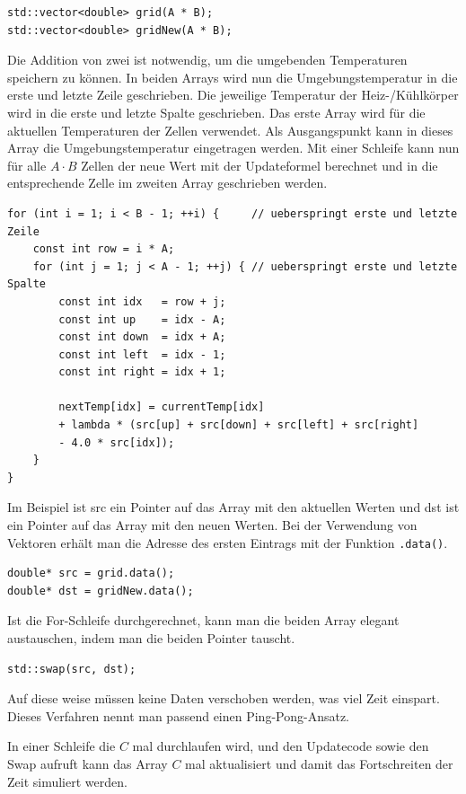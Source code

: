 \begin{lstlisting}
std::vector<double> grid(A * B);
std::vector<double> gridNew(A * B);
\end{lstlisting}
Die Addition von zwei ist notwendig, um die umgebenden Temperaturen speichern zu können.
In beiden Arrays wird nun die Umgebungstemperatur in die erste und letzte Zeile geschrieben.
Die jeweilige Temperatur der Heiz-/Kühlkörper wird in die erste und letzte Spalte geschrieben.
Das erste Array wird für die aktuellen Temperaturen der Zellen verwendet.
Als Ausgangspunkt kann in dieses Array die Umgebungstemperatur eingetragen werden.
Mit einer Schleife kann nun für alle $A \cdot B$ Zellen der neue Wert mit der Updateformel berechnet und in die entsprechende Zelle im zweiten Array geschrieben werden.
\begin{lstlisting}[caption={Update-Schritt (seriell)},label={parallelisierung:code:updateSeriel}]
for (int i = 1; i < B - 1; ++i) {     // ueberspringt erste und letzte Zeile
	const int row = i * A;
	for (int j = 1; j < A - 1; ++j) { // ueberspringt erste und letzte Spalte
		const int idx   = row + j;
		const int up    = idx - A;
		const int down  = idx + A;
		const int left  = idx - 1;
		const int right = idx + 1;
		
		nextTemp[idx] = currentTemp[idx]
		+ lambda * (src[up] + src[down] + src[left] + src[right]
		- 4.0 * src[idx]);
	}
}
\end{lstlisting}
Im Beispiel ist src ein Pointer auf das Array mit den aktuellen Werten und dst ist ein Pointer auf das Array mit den neuen Werten.
Bei der Verwendung von Vektoren erhält man die Adresse des ersten Eintrags mit der Funktion \texttt{.data()}.
\begin{lstlisting}
double* src = grid.data();
double* dst = gridNew.data();
\end{lstlisting}

Ist die For-Schleife durchgerechnet, kann man die beiden Array elegant austauschen, indem man die beiden Pointer tauscht.
\begin{lstlisting}
std::swap(src, dst);
\end{lstlisting}
Auf diese weise müssen keine Daten verschoben werden, was viel Zeit einspart.
Dieses Verfahren nennt man passend einen Ping-Pong-Ansatz.

In einer Schleife die $C$ mal durchlaufen wird, und den Updatecode sowie den Swap aufruft kann das Array $C$ mal aktualisiert und damit das Fortschreiten der Zeit simuliert werden.

